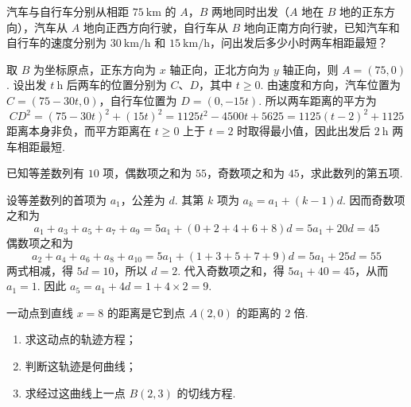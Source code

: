 \begin{problem}
汽车与自行车分别从相距 \(75\mathrm{~km}\) 的 \(A\)，\(B\) 两地同时出发（\(A\) 地在 \(B\) 地的正东方向），汽车从 \(A\) 地向正西方向行驶，自行车从 \(B\) 地向正南方向行驶，已知汽车和自行车的速度分别为 \(30\mathrm{~km/h}\) 和 \(15\mathrm{~km/h}\)，问出发后多少小时两车相距最短？
\end{problem}

\begin{solution}
取 \(B\) 为坐标原点，正东方向为 \(x\) 轴正向，正北方向为 \(y\) 轴正向，则 \(A=\left(75,0\right)\). 设出发 \(t\mathrm{~h}\) 后两车的位置分别为 \(C\)、\(D\)，其中 \(t\geqslant0\). 由速度和方向，汽车位置为 \(C=\left(75-30t,0\right)\)，自行车位置为 \(D=\left(0,-15t\right)\). 所以两车距离的平方为
\[
CD^2=\left(75-30t\right)^2+\left(15t\right)^2
=1125t^2-4500t+5625
=1125\left(t-2\right)^2+1125
\]
距离本身非负，而平方距离在 \(t\geqslant0\) 上于 \(t=2\) 时取得最小值，因此出发后 \(2\mathrm{~h}\) 两车相距最短.
\end{solution}

\begin{problem}
已知等差数列有 \(10\) 项，偶数项之和为 \(55\)，奇数项之和为 \(45\)，求此数列的第五项.
\end{problem}

\begin{solution}
设等差数列的首项为 \(a_1\)，公差为 \(d\). 其第 \(k\) 项为 \(a_k=a_1+(k-1)d\). 因而奇数项之和为
\[
a_1+a_3+a_5+a_7+a_9=5a_1+\left(0+2+4+6+8\right)d=5a_1+20d=45
\]
偶数项之和为
\[
a_2+a_4+a_6+a_8+a_{10}=5a_1+\left(1+3+5+7+9\right)d=5a_1+25d=55
\]
两式相减，得 \(5d=10\)，所以 \(d=2\). 代入奇数项之和，得 \(5a_1+40=45\)，从而 \(a_1=1\). 因此 \(a_5=a_1+4d=1+4\times2=9\).
\end{solution}

\begin{problem}
一动点到直线 \(x=8\) 的距离是它到点 \(A\left(2,0\right)\) 的距离的 \(2\) 倍.

\begin{enumerate}
\item 求这动点的轨迹方程；
\item 判断这轨迹是何曲线；
\item 求经过这曲线上一点 \(B\left(2,3\right)\) 的切线方程.
\end{enumerate}
\end{problem}


